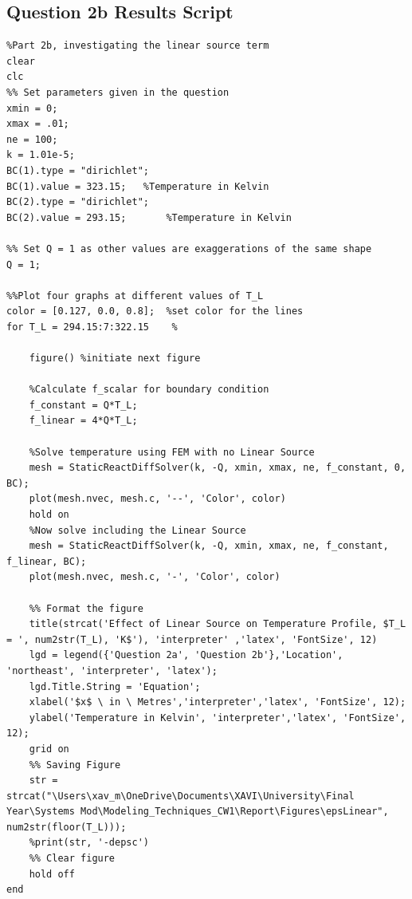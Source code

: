 \documentclass[11pt]{article}
\begin{document}
\begin{appendices}
\subsection{Question 2b Results Script}\label{ap:Q2b}
\begin{lstlisting}
%Part 2b, investigating the linear source term
clear
clc
%% Set parameters given in the question
xmin = 0;
xmax = .01;
ne = 100;
k = 1.01e-5;
BC(1).type = "dirichlet";
BC(1).value = 323.15;   %Temperature in Kelvin
BC(2).type = "dirichlet";
BC(2).value = 293.15;       %Temperature in Kelvin

%% Set Q = 1 as other values are exaggerations of the same shape
Q = 1;

%%Plot four graphs at different values of T_L
color = [0.127, 0.0, 0.8];  %set color for the lines
for T_L = 294.15:7:322.15    %
    
    figure() %initiate next figure
    
    %Calculate f_scalar for boundary condition
    f_constant = Q*T_L;
    f_linear = 4*Q*T_L;
    
    %Solve temperature using FEM with no Linear Source
    mesh = StaticReactDiffSolver(k, -Q, xmin, xmax, ne, f_constant, 0, BC);
    plot(mesh.nvec, mesh.c, '--', 'Color', color)
    hold on
    %Now solve including the Linear Source
    mesh = StaticReactDiffSolver(k, -Q, xmin, xmax, ne, f_constant, f_linear, BC);
    plot(mesh.nvec, mesh.c, '-', 'Color', color)
    
    %% Format the figure
    title(strcat('Effect of Linear Source on Temperature Profile, $T_L = ', num2str(T_L), 'K$'), 'interpreter' ,'latex', 'FontSize', 12)
    lgd = legend({'Question 2a', 'Question 2b'},'Location', 'northeast', 'interpreter', 'latex');
    lgd.Title.String = 'Equation';
    xlabel('$x$ \ in \ Metres','interpreter','latex', 'FontSize', 12);
    ylabel('Temperature in Kelvin', 'interpreter','latex', 'FontSize', 12);
    grid on
    %% Saving Figure
    str = strcat("\Users\xav_m\OneDrive\Documents\XAVI\University\Final Year\Systems Mod\Modeling_Techniques_CW1\Report\Figures\epsLinear", num2str(floor(T_L)));
    %print(str, '-depsc')
    %% Clear figure
    hold off
end
\end{lstlisting}

\end{appendices}
\end{document}

